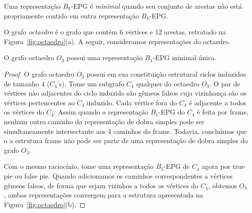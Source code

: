 
\begin{definition}
Uma representação $B_k$-EPG é \emph{minimal} quando seu conjunto de arestas não está propriamente contido em outra representação $B_k$-EPG.
\end{definition}

O grafo \textit{octaedro} é o grafo que contém  6 vértices e 12 arestas, retratado na  Figura~\ref{fig:octaedro}(a). A seguir, consideramos  representações do octaedro.

\begin{lema}\label{lem:octaedronaohelly}
O grafo octaedro  $O_3$ possui uma representação $ B_1$-EPG minimal única.
\end{lema}
\begin{proof}
O grafo octaedro $ O_3 $ possui em sua constituição estrutural ciclos induzidos de tamanho  4 ($ C_4$'s). 
Tome um subgrafo $ C_4 $ qualquer do octaedro $ O_3$. O par de vértices não adjacentes do ciclo induzido são gêmeos falsos cuja vizinhança são os vértices pertencentes ao $C_4$ induzido. Cada vértice fora do $C_4$ é adjacente a todos os vértices do $C_4$. Assim quando a representação $ B_1$-EPG do $C_4$ é feita por  frame, nenhum outro caminho da representação de dobra simples pode ser simultaneamente intersectante aos 4 caminhos do frame. Todavia, concluímos que o a estrutura frame não pode ser parte de uma representação de dobra simples do grafo $ O_3$.

Com o mesmo raciocínio, tome uma representação $ B_1$-EPG de $C_4$ agora por true pie ou false pie. Quando adicionamos os caminhos correspondentes a vértices gêmeos falsos, de forma que sejam vizinhos a todos os vértices do $ C_4 $, obtemos $ O_3$, ambas representações convergem para a estrutura apresentada na Figura~\ref{fig:octaedro}(b). 
 \end{proof}

 

